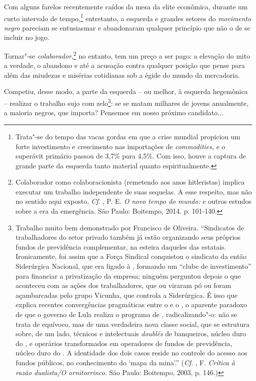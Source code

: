 Com alguns farelos recentemente caídos da mesa da elite econômica,
durante um curto intervalo de tempo,\footnote{Trata"-se do tempo das vacas
  gordas em que a crise mundial propiciou um forte investimento e
  crescimento nas importações de \emph{commodities,} e o superávit
  primário passou de 3,7\% para 4,5\%. Com isso, houve a captura de
  grande parte da esquerda tanto material quanto espiritualmente.}
entretanto, a esquerda e grandes setores do \emph{movimento negro}
pareciam se entusiasmar e abandonaram qualquer princípio que não o de se
incluir no jogo.

Tornar"-se \emph{colaborador},\footnote{Colaborador como colaboracionista
  (remetendo aos anos hitleristas) implica executar um trabalho
  independente de suas sequelas. A esse respeito, mas não no sentido
  aqui exposto, \emph{Cf}. , P. E. \emph{O novo tempo do mundo:} e
  outros estudos sobre a era da emergência. São Paulo: Boitempo, 2014.
  p. 101-140.} no entanto, tem um preço a ser pago: a elevação do mito
a verdade, o abandono e até a acusação contra qualquer posição que pense
para além das miudezas e misérias cotidianas sob a égide do mundo da
mercadoria.

Competiu, desse modo, a parte da esquerda -- ou melhor, à esquerda
hegemônica -- realizar o trabalho sujo com zelo\footnote{Trabalho muito
  bem demonstrado por Francisco de Oliveira. ``Sindicatos de
  trabalhadores do setor privado também já estão organizando seus
  próprios fundos de previdência complementar, na esteira daqueles das
  estatais. Ironicamente, foi assim que a Força Sindical conquistou o
  sindicato da então Siderúrgica Nacional, que era ligado à ,
  formando um ``clube de investimento'' para financiar a privatização da
  empresa; ninguém perguntou depois o que aconteceu com as ações dos
  trabalhadores, que ou viraram pó ou foram açambarcadas pelo grupo
  Vicunha, que controla a Siderúrgica. É isso que explica recentes
  convergências pragmáticas entre o  e o , o aparente paradoxo de
  que o governo de Lula realiza o programa de , radicalizando"-o: não
  se trata de equívoco, mas de uma verdadeira nova classe social, que se
  estrutura sobre, de um lado, técnicos e intelectuais \emph{doublés} de
  banqueiros, núcleo duro do , e operários transformados em
  operadores de fundos de previdência, núcleo duro do . A identidade
  dos dois casos reside no controle do acesso aos fundos públicos, no
  conhecimento do `mapa da mina'.'' (\emph{Cf}. , F. \emph{Crítica à
  razão dualista/O ornitorrinco}. São Paulo: Boitempo, 2003, p. 146.)}:
se se matam milhares de jovens anualmente, a maioria negros, que
importa? Pensemos em nosso próximo candidato...

